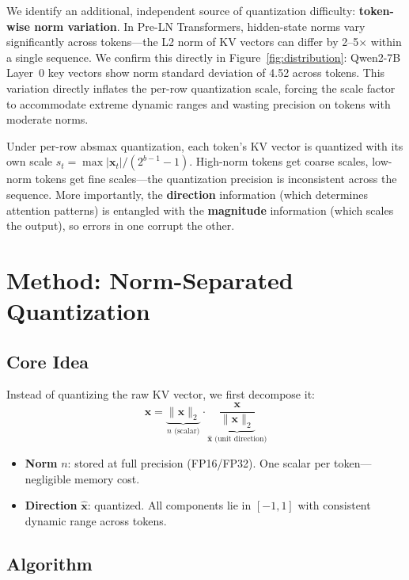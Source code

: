 \documentclass[11pt]{article}
\begin{document}
We identify an additional, independent source of quantization difficulty: \textbf{token-wise norm variation}. In Pre-LN Transformers, hidden-state norms vary significantly across tokens---the L2 norm of KV vectors can differ by 2--5$\times$ within a single sequence. We confirm this directly in Figure~\ref{fig:distribution}: Qwen2-7B Layer~0 key vectors show norm standard deviation of 4.52 across tokens. This variation directly inflates the per-row quantization scale, forcing the scale factor to accommodate extreme dynamic ranges and wasting precision on tokens with moderate norms.

Under per-row absmax quantization, each token's KV vector is quantized with its own scale $s_t = \max|\mathbf{x}_t| / (2^{b-1}-1)$. High-norm tokens get coarse scales, low-norm tokens get fine scales---the quantization precision is inconsistent across the sequence. More importantly, the \textbf{direction} information (which determines attention patterns) is entangled with the \textbf{magnitude} information (which scales the output), so errors in one corrupt the other.

\section{Method: Norm-Separated Quantization}

\subsection{Core Idea}

Instead of quantizing the raw KV vector, we first decompose it:
\begin{equation}
\mathbf{x} = \underbrace{\|\mathbf{x}\|_2}_{n \text{ (scalar)}} \cdot \underbrace{\frac{\mathbf{x}}{\|\mathbf{x}\|_2}}_{\hat{\mathbf{x}} \text{ (unit direction)}}
\end{equation}

\begin{itemize}[nosep]
  \item \textbf{Norm} $n$: stored at full precision (FP16/FP32). One scalar per token---negligible memory cost.
  \item \textbf{Direction} $\hat{\mathbf{x}}$: quantized. All components lie in $[-1, 1]$ with consistent dynamic range across tokens.
\end{itemize}

\subsection{Algorithm}
\end{document}
